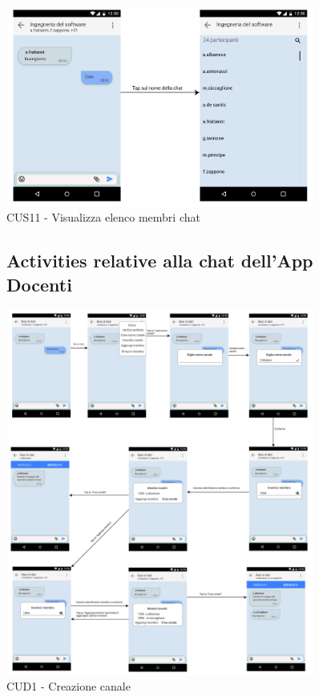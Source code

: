 \begin{figure}
	\centering
	\includegraphics[width=0.9\textwidth]{imgs/gruppo6/activities/act_cus11_elenco_membri.pdf}
	\caption{CUS11 - Visualizza elenco membri chat}
	\label{fig:cus11}
\end{figure}

\pagebreak
\begin{figure}
\subsection{Activities relative alla chat dell'App Docenti}
	\centering
	\includegraphics[width=0.9\textwidth]{imgs/gruppo6/activities/act_cud1_creazione_canale.pdf}
	\caption{CUD1 - Creazione canale}
	\label{fig:cud1}
\end{figure}

